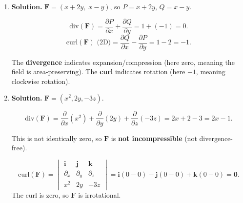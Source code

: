 \begin{enumerate}
If Green's Theorem applied directly, we would conclude $\oint_C \mathbf{F}\cdot d\mathbf{r}=\iint_D 0\,dA = 0$. However, $\mathbf{F}$ is undefined at the origin, which lies inside $C$ (the circle of radius $r$). The domain is \textbf{not simply connected}, so Green's Theorem does not apply to the region enclosed by $C$.

Computing directly with parameterization $x=r\cos t$, $y=r\sin t$, $t\in[0,2\pi]$:
\begin{align*}
\oint_C \mathbf{F}\cdot d\mathbf{r} &= \int_0^{2\pi}\left[\frac{-r\sin t}{r^2}(-r\sin t)+\frac{r\cos t}{r^2}(r\cos t)\right]dt \\
&= \int_0^{2\pi}(\sin^2 t + \cos^2 t)\,dt = \boxed{2\pi}.
\end{align*}

This demonstrates the crucial role of simple connectivity: $\partial Q/\partial x = \partial P/\partial y$ everywhere in the domain, yet the field is not conservative because the domain has a ``hole'' at the origin.

\item \textbf{Solution.}
$\mathbf{F}=(x+2y,\;x-y)$, so $P=x+2y$, $Q=x-y$.

\[
\text{div}(\mathbf{F}) = \frac{\partial P}{\partial x}+\frac{\partial Q}{\partial y} = 1+(-1) = \boxed{0}.
\]
\[
\text{curl}(\mathbf{F})\text{ (2D)} = \frac{\partial Q}{\partial x}-\frac{\partial P}{\partial y} = 1-2 = \boxed{-1}.
\]

The \textbf{divergence} indicates expansion/compression (here zero, meaning the field is area-preserving). The \textbf{curl} indicates rotation (here $-1$, meaning clockwise rotation).

\item \textbf{Solution.}
$\mathbf{F}=(x^2, 2y, -3z)$.

\[
\text{div}(\mathbf{F}) = \frac{\partial}{\partial x}(x^2)+\frac{\partial}{\partial y}(2y)+\frac{\partial}{\partial z}(-3z) = 2x+2-3 = 2x-1.
\]

This is not identically zero, so $\mathbf{F}$ is \textbf{not incompressible} (not divergence-free).

\[
\text{curl}(\mathbf{F}) = \begin{vmatrix}\mathbf{i}&\mathbf{j}&\mathbf{k}\\ \partial_x&\partial_y&\partial_z\\ x^2&2y&-3z\end{vmatrix} = \mathbf{i}(0-0)-\mathbf{j}(0-0)+\mathbf{k}(0-0) = \boxed{\mathbf{0}}.
\]
The curl is zero, so $\mathbf{F}$ is irrotational.


\end{enumerate}
